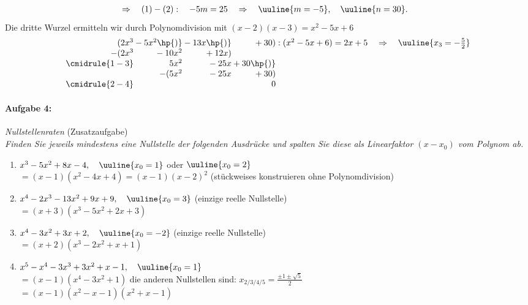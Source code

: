 \begin{enumerate}[label=(\alph*)]
\begin{align*}
        & \Rightarrow \quad (1)-(2): \quad -5m = 25 \quad \Rightarrow \quad \uuline{m= -5}, \quad \uuline{n=30}.
    \end{align*}
    Die dritte Wurzel ermitteln wir durch Polynomdivision mit $(x-2)(x-3) = x^2 - 5x+6$
    \begin{align*}
        \begin{array}{r@{} r@{} r@{} r@{} r}
            (2x^3 &{}-5x^2\hp{)}&{}-13x\hp{)}&{}+30) &\;:(x^2-5x+6) = 2x+5 \quad \Rightarrow  \quad \uuline{x_3 = -\frac{5}{2}}\\
          -(2x^3 &{}-10x^2&{}+12x) \\ 
          \cmidrule{1-3}
                & 5x^2 &{} -25x &{}+30\hp{)}\\
                &-(5x^2&{} -25x&{}+30)\\
          \cmidrule{2-4} 
                & & & 0
        \end{array}\\
    \end{align*}
\end{enumerate}

\newpage
\paragraph{Aufgabe 4: } \emph{Nullstellenraten} \hfill (Zusatzaufgabe)\\[0.2cm]
\emph{Finden Sie jeweils mindestens eine Nullstelle der folgenden Ausdrücke und spalten Sie diese als Linearfaktor $(x-x_0)$ vom Polynom ab.}
    \begin{enumerate}[label=(\alph*), labelindent=1em,labelsep=0.5cm]
        \item $x^3-5x^2+8x-4, \quad \uuline{x_0=1}$ oder $\uuline{x_0=2}$ \\
        $= (x-1)(x^2-4x+4) = (x-1)(x-2)^2$ \quad (stückweises konstruieren ohne Polynomdivision)
        \item $x^4-2x^3-13x^2+9x+9, \quad \uuline{x_0=3}$ \hfill(einzige reelle Nullstelle)\\
        $=(x+3)(x^3-5x^2+2x+3)$
        \item $x^4-3x^2+3x+2, \quad \uuline{x_0=-2}$ \hfill(einzige reelle Nullstelle) \\
        $=(x+2)(x^3-2x^2+x+1)$
        \item $x^5-x^4-3x^3+3x^2+x-1, \quad \uuline{x_0 = 1}$\\[-3mm]
        $=(x-1)(x^4-3x^2+1)$ \hfill die anderen Nullstellen sind: $x_{2/3/4/5} = \frac{\pm 1 \pm \sqrt{5}}{2}$\\
        $= (x-1)(x^2-x-1)(x^2+x-1)$
    \end{enumerate}
%
